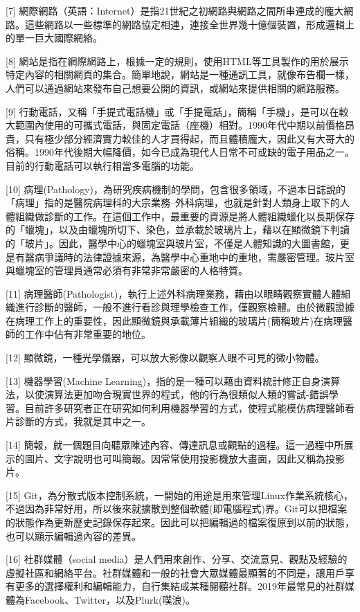 \documentclass[a5paper, 11pt
]{book}
\begin{document}
{[}7{]}
網際網路（英語：Internet）是指21世紀之初網路與網路之間所串連成的龐大網路。這些網路以一些標準的網路協定相連，連接全世界幾十億個裝置，形成邏輯上的單一巨大國際網絡。

{[}8{]}
網站是指在網際網路上，根據一定的規則，使用HTML等工具製作的用於展示特定內容的相關網頁的集合。簡單地說，網站是一種通訊工具，就像布告欄一樣，人們可以通過網站來發布自己想要公開的資訊，或網站來提供相關的網路服務。

{[}9{]}
行動電話，又稱「手提式電話機」或「手提電話」，簡稱「手機」，是可以在較大範圍內使用的可攜式電話，與固定電話（座機）相對。1990年代中期以前價格昂貴，只有極少部分經濟實力較佳的人才買得起，而且體積龐大，因此又有大哥大的俗稱。1990年代後期大幅降價，如今已成為現代人日常不可或缺的電子用品之一。目前的行動電話可以執行相當多電腦的功能。

{[}10{]}
病理(Pathology)，為研究疾病機制的學問，包含很多領域，不過本日誌說的「病理」指的是醫院病理科的大宗業務--外科病理，也就是針對人類身上取下的人體組織做診斷的工作。在這個工作中，最重要的資源是將人體組織蠟化以長期保存的「蠟塊」，以及由蠟塊所切下、染色，並承載於玻璃片上，藉以在顯微鏡下判讀的「玻片」。因此，醫學中心的蠟塊室與玻片室，不僅是人體知識的大圖書館，更是有醫病爭議時的法律證據來源，為醫學中心重地中的重地，需嚴密管理。玻片室與蠟塊室的管理員通常必須有非常非常嚴密的人格特質。

{[}11{]}
病理醫師(Pathologist)，執行上述外科病理業務，藉由以眼睛觀察實體人體組織進行診斷的醫師，一般不進行看診與理學檢查工作，僅觀察檢體。由於微觀證據在病理工作上的重要性，因此顯微鏡與承載薄片組織的玻璃片(簡稱玻片)在病理醫師的工作中佔有非常重要的地位。

{[}12{]} 顯微鏡，一種光學儀器，可以放大影像以觀察人眼不可見的微小物體。

{[}13{]} 機器學習(Machine
Learning)，指的是一種可以藉由資料統計修正自身演算法，以使演算法更加吻合現實世界的程式，他的行為很類似人類的嘗試-錯誤學習。目前許多研究者正在研究如何利用機器學習的方式，使程式能模仿病理醫師看片診斷的方式，我就是其中之一。

{[}14{]}
簡報，就一個題目向聽眾陳述內容、傳達訊息或觀點的過程。這一過程中所展示的圖片、文字說明也可叫簡報。因常常使用投影機放大畫面，因此又稱為投影片。

{[}15{]}
Git，為分散式版本控制系統，一開始的用途是用來管理Linux作業系統核心，不過因為非常好用，所以後來就擴散到整個軟體(即電腦程式)界。Git可以把檔案的狀態作為更新歷史記錄保存起來。因此可以把編輯過的檔案復原到以前的狀態，也可以顯示編輯過內容的差異。

{[}16{]} 社群媒體（social
media）是人們用來創作、分享、交流意見、觀點及經驗的虛擬社區和網絡平台。社群媒體和一般的社會大眾媒體最顯著的不同是，讓用戶享有更多的選擇權利和編輯能力，自行集結成某種閱聽社群。2019年最常見的社群媒體為Facebook、Twitter，以及Plurk(噗浪)。
\end{document}
